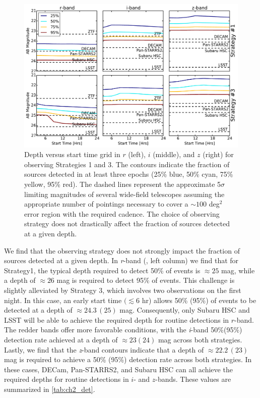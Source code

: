 \begin{figure}[t!]
\centering
\includegraphics[width=\textwidth]{./figs/chapter2/f4.pdf}
\caption{\singlespace Depth versus start time grid in $r$ (left), $i$ (middle), and $z$ (right) for observing Strategies 1 and 3. The contours indicate the fraction of sources detected in at least three epochs (25\% blue, 50\% cyan, 75\% yellow, 95\% red). The dashed lines represent the approximate 5$\sigma$ limiting magnitudes of several wide-field telescopes assuming the appropriate number of pointings necessary to cover a $\sim 100$ deg$^2$ error region with the required cadence. The choice of observing strategy does not drastically affect the fraction of sources detected at a given depth.}
\label{fig:ch2_det}
\end{figure}

We find that the observing strategy does not strongly impact the fraction of sources detected at a given depth. In {\em r}-band (, left column) we find that for Strategy1, the typical depth required to detect 50\% of events is $\approx25$ mag, while a depth of $\approx26$ mag is required to detect 95\% of events. This challenge is slightly alleviated by Strategy 3, which involves two observations on the first night. In this case, an early start time $(\lesssim 6$ hr) allows 50\% (95\%) of events to be detected at a depth of $\approx24.3\,(25)$ mag. Consequently, only Subaru HSC and LSST will be able to achieve the required depth for routine detections in $r$-band. The redder bands offer more favorable conditions, with the {\em i}-band 50\%(95\%) detection rate achieved at a depth of $\approx 23(24)$ mag across both strategies. Lastly, we find that the {\em z}-band contours indicate that a depth of $\approx22.2\,(23)$ mag is required to achieve a 50\% (95\%) detection rate across both strategies. In these cases, DECam, Pan-STARRS2, and Subaru HSC can all achieve the required depths for routine detections in $i$- and $z$-bands.  These values are summarized in \cref{tab:ch2_det}.

